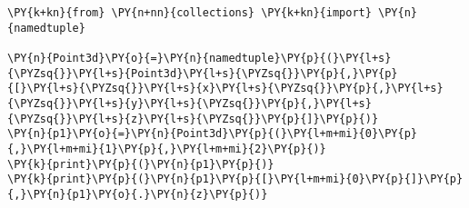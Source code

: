 \begin{Verbatim}[commandchars=\\\{\}]
\PY{k+kn}{from} \PY{n+nn}{collections} \PY{k+kn}{import} \PY{n}{namedtuple}

\PY{n}{Point3d}\PY{o}{=}\PY{n}{namedtuple}\PY{p}{(}\PY{l+s}{\PYZsq{}}\PY{l+s}{Point3d}\PY{l+s}{\PYZsq{}}\PY{p}{,}\PY{p}{[}\PY{l+s}{\PYZsq{}}\PY{l+s}{x}\PY{l+s}{\PYZsq{}}\PY{p}{,}\PY{l+s}{\PYZsq{}}\PY{l+s}{y}\PY{l+s}{\PYZsq{}}\PY{p}{,}\PY{l+s}{\PYZsq{}}\PY{l+s}{z}\PY{l+s}{\PYZsq{}}\PY{p}{]}\PY{p}{)}
\PY{n}{p1}\PY{o}{=}\PY{n}{Point3d}\PY{p}{(}\PY{l+m+mi}{0}\PY{p}{,}\PY{l+m+mi}{1}\PY{p}{,}\PY{l+m+mi}{2}\PY{p}{)}
\PY{k}{print}\PY{p}{(}\PY{n}{p1}\PY{p}{)}
\PY{k}{print}\PY{p}{(}\PY{n}{p1}\PY{p}{[}\PY{l+m+mi}{0}\PY{p}{]}\PY{p}{,}\PY{n}{p1}\PY{o}{.}\PY{n}{z}\PY{p}{)}
\end{Verbatim}
